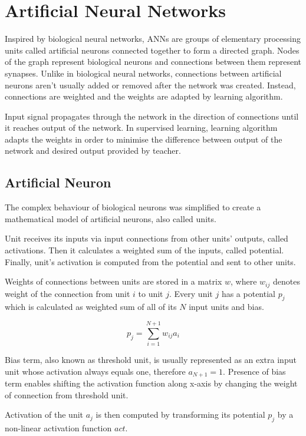 \documentclass[12pt,oneside]{fithesis2}
\begin{document}
\chapter{Artificial Neural Networks}
Inspired by biological neural networks, ANNs are groups of elementary processing units called artificial neurons connected together to form a directed graph. Nodes of the graph represent biological neurons and connections between them represent synapses. Unlike in biological neural networks, connections between artificial neurons aren't usually added or removed after the network was created. Instead, connections are weighted and the weights are adapted by learning algorithm. \par

Input signal propagates through the network in the direction of connections until it reaches output of the network. In supervised learning, learning algorithm adapts the weights in order to minimise the difference between output of the network and desired output provided by teacher.

\section{Artificial Neuron}
The complex behaviour of biological neurons was simplified to create a mathematical model of artificial neurons, also called units. \par
Unit receives its inputs via input connections from other units' outputs, called activations. Then it calculates a weighted sum of the inputs, called potential. Finally, unit's activation is computed from the potential and sent to other units. \par

Weights of connections between units are stored in a matrix $w$, where $w_{ij}$ denotes weight of the connection from unit $i$ to unit $j$. Every unit $j$ has a potential $p_j$ which is calculated as weighted sum of all of its $N$ input units and bias. \par

$$p_{j} = \sum\limits_{i = 1}^{N+1} w_{ij} a_{i}$$

Bias term, also known as threshold unit, is usually represented as an extra input unit whose activation always equals one, therefore $a_{N+1} = 1$. Presence of bias term enables shifting the activation function along x-axis by changing the weight of connection from threshold unit.

Activation of the unit $a_j$ is then computed by transforming its potential $p_j$ by a non-linear activation function $act$.
\end{document}
